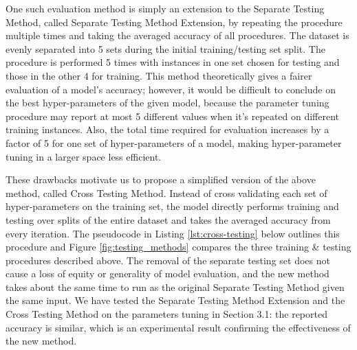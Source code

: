 \documentclass[letterpaper,twocolumn,10pt]{article}
\begin{document}
One such evaluation method is simply an extension to the Separate Testing Method, called Separate Testing Method Extension, by repeating the procedure multiple times and taking the averaged accuracy of all procedures. The dataset is evenly separated into 5 sets during the initial training/testing set split. The procedure is performed 5 times with instances in one set chosen for testing and those in the other 4 for training. This method theoretically gives a fairer evaluation of a model's accuracy; however, it would be difficult to conclude on the best hyper-parameters of the given model, because the parameter tuning procedure may report at most 5 different values when it's repeated on different training instances. Also, the total time required for evaluation increases by a factor of 5 for one set of hyper-parameters of a model, making hyper-parameter tuning in a larger space less efficient.

These drawbacks motivate us to propose a simplified version of the above method, called Cross Testing Method. Instead of cross validating each set of hyper-parameters on the training set, the model directly performs training and testing over splits of the entire dataset and takes the averaged accuracy from every iteration. The pseudocode in Listing \ref{lst:cross-testing} below outlines this procedure and Figure \ref{fig:testing_methods} compares the three training \& testing procedures described above. The removal of the separate testing set does not cause a loss of equity or generality of model evaluation, and the new method takes about the same time to run as the original Separate Testing Method given the same input. We have tested the Separate Testing Method Extension and the Cross Testing Method on the parameters tuning in Section 3.1: the reported accuracy is similar, which is an experimental result confirming the effectiveness of the new method.
\end{document}
